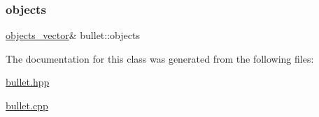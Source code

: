 \mbox{\label{classbullet_a93b79bed80ce59b86e3fd332d0c03c5c}} 
\subsubsection{\texorpdfstring{objects}{objects}}
{\footnotesize\ttfamily \hyperlink{drawable_8hpp_a6c0fdb1dfd0c34dbbdbb5dcd3c608b07}{objects\+\_\+vector}\& bullet\+::objects\hspace{0.3cm}{\ttfamily [private]}}



The documentation for this class was generated from the following files\+:\begin{DoxyCompactItemize}
\item 
\hyperlink{bullet_8hpp}{bullet.\+hpp}\item 
\hyperlink{bullet_8cpp}{bullet.\+cpp}\end{DoxyCompactItemize}
